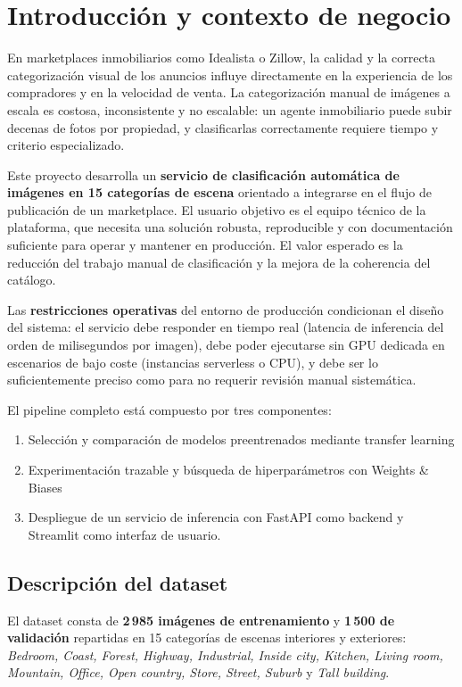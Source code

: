 \section{Introducción y contexto de negocio}

En marketplaces inmobiliarios como Idealista o Zillow, la calidad y la correcta categorización visual de los anuncios influye directamente en la experiencia de los compradores y en la velocidad de venta. La categorización manual de imágenes a escala es costosa, inconsistente y no escalable: un agente inmobiliario puede subir decenas de fotos por propiedad, y clasificarlas correctamente requiere tiempo y criterio especializado.

Este proyecto desarrolla un \textbf{servicio de clasificación automática de imágenes en 15 categorías de escena} orientado a integrarse en el flujo de publicación de un marketplace. El usuario objetivo es el equipo técnico de la plataforma, que necesita una solución robusta, reproducible y con documentación suficiente para operar y mantener en producción. El valor esperado es la reducción del trabajo manual de clasificación y la mejora de la coherencia del catálogo.

Las \textbf{restricciones operativas} del entorno de producción condicionan el diseño del sistema: el servicio debe responder en tiempo real (latencia de inferencia del orden de milisegundos por imagen), debe poder ejecutarse sin GPU dedicada en escenarios de bajo coste (instancias serverless o CPU), y debe ser lo suficientemente preciso como para no requerir revisión manual sistemática.

El pipeline completo está compuesto por tres componentes:
\begin{enumerate}
    \item Selección y comparación de modelos preentrenados mediante transfer learning
    \item Experimentación trazable y búsqueda de hiperparámetros con Weights \& Biases
    \item Despliegue de un servicio de inferencia con FastAPI como backend y Streamlit como interfaz de usuario.
\end{enumerate}

\subsection{Descripción del dataset}

El dataset consta de \textbf{2\,985 imágenes de entrenamiento} y \textbf{1\,500 de validación} repartidas en 15 categorías de escenas interiores y exteriores: \textit{Bedroom, Coast, Forest, Highway, Industrial, Inside city, Kitchen, Living room, Mountain, Office, Open country, Store, Street, Suburb} y \textit{Tall building}. 
